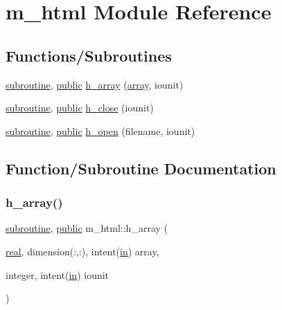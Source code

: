 \hypertarget{namespacem__html}{}\section{m\+\_\+html Module Reference}
\label{namespacem__html}
\subsection*{Functions/\+Subroutines}
\begin{DoxyCompactItemize}
\item 
\hyperlink{M__stopwatch_83_8txt_acfbcff50169d691ff02d4a123ed70482}{subroutine}, \hyperlink{M__stopwatch_83_8txt_a2f74811300c361e53b430611a7d1769f}{public} \hyperlink{namespacem__html_ad97e98e7241f29c59740757fecd5e6ce}{h\+\_\+array} (\hyperlink{intro__blas1_83_8txt_a89db1945e1a335ab0184c6a097821e32}{array}, iounit)
\item 
\hyperlink{M__stopwatch_83_8txt_acfbcff50169d691ff02d4a123ed70482}{subroutine}, \hyperlink{M__stopwatch_83_8txt_a2f74811300c361e53b430611a7d1769f}{public} \hyperlink{namespacem__html_a3c7065739f09d91dd595f97ebb21583d}{h\+\_\+close} (iounit)
\item 
\hyperlink{M__stopwatch_83_8txt_acfbcff50169d691ff02d4a123ed70482}{subroutine}, \hyperlink{M__stopwatch_83_8txt_a2f74811300c361e53b430611a7d1769f}{public} \hyperlink{namespacem__html_a2188f9871e716a7812d2ab9fb91fde40}{h\+\_\+open} (filename, iounit)
\end{DoxyCompactItemize}


\subsection{Function/\+Subroutine Documentation}
\mbox{\label{namespacem__html_ad97e98e7241f29c59740757fecd5e6ce}} 
\subsubsection{\texorpdfstring{h\+\_\+array()}{h\_array()}}
{\footnotesize\ttfamily \hyperlink{M__stopwatch_83_8txt_acfbcff50169d691ff02d4a123ed70482}{subroutine}, \hyperlink{M__stopwatch_83_8txt_a2f74811300c361e53b430611a7d1769f}{public} m\+\_\+html\+::h\+\_\+array (\begin{DoxyParamCaption}\item[{\hyperlink{read__watch_83_8txt_abdb62bde002f38ef75f810d3a905a823}{real}, dimension(\+:,\+:), intent(\hyperlink{M__journal_83_8txt_afce72651d1eed785a2132bee863b2f38}{in})}]{array,  }\item[{integer, intent(\hyperlink{M__journal_83_8txt_afce72651d1eed785a2132bee863b2f38}{in})}]{iounit }\end{DoxyParamCaption})}

